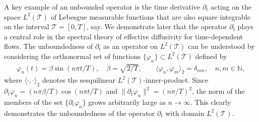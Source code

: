 \documentclass[leqno,onefignum,onetabnum]{siamltex1213}
\newcommand{\Tc}{\mathcal{T}}
\begin{document}
A key example of an unbounded operator is the time derivative
$\partial_t$ acting on the space $L^2(\Tc)$ of Lebesgue measurable functions
that are also square integrable on the interval $\Tc=[0,T]$, say. We
demonstrate later that the operator $\partial_t$ plays a central role in the
spectral theory of effective diffusivity for time-dependent
flows. The unboundedness of $\partial_t$ as an operator on $L^2(\Tc)$ can be
understood by considering the orthonormal set of functions
$\{\varphi_n\}\subset L^2(\Tc)$ defined by     
%
\begin{align}\label{eq:Orthonormal}
  \varphi_n(t)=\beta\sin(n\pi t/T), \quad
  \beta=\sqrt{2/T},
  \qquad
  \langle\varphi_n,\varphi_m\rangle_2=\delta_{nm}, \quad
  n,m\in\mathbb{N},
\end{align}
%
where $\langle\cdot,\cdot\rangle_2$ denotes the sesquilinear
$L^2(\Tc)$-inner-product. Since $\partial_t\varphi_n=(n\pi\beta/T)\cos(n\pi t/T)$ and
$\|\partial_t\varphi_n\|^2=(n\pi/T)^2$, the norm of the members of the set $\{\partial_t\varphi_n\}$
grows arbitrarily large as $n\to\infty$. This clearly demonstrates the
unboundedness of the operator $\partial_t$ with domain $L^2(\Tc)$.
\end{document}
